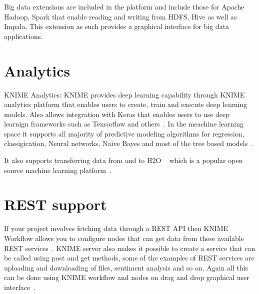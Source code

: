 Big data extensions are included in the platform and include those for Apache
Hadoop, Spark that enable reading and writing from HDFS, Hive as well as
Impala. This extension as such provides a graphical interface for big data
applications.

\section{Analytics}
KNIME Analytics: KNIME provides deep learning capability through KNIME analytics
platform that enables users to create, train and execute deep learning
models. Also allows integration with Keras that enables users to use deep
learnign frameworks such as Tensorflow and others~\cite{hid-sp18-517-dl}. In the
meachine learning space it supports all majority of predictive modeling
algorithms for regression, classigication, Neural networks, Naive Bayes and most
of the tree based models~\cite{hid-sp18-517-pml}.

It also supports transferring data from and to H2O ~\cite{hid-sp18-517-h20}
which is a popular open source machine learning
platform~\cite{hid-sp18-517-knimeh20}.

\section{REST support}

If your project involves fetching data through a REST API then KNIME Workflow
allows you to configure nodes that can get data from these available REST
services~\cite{hid-sp18-517-knimeapi}.  KNIME server also makes it possible to
create a service that can be called using post and get methods, some of the
examples of REST services are uploading and downloading of files, sentiment
analysis and so on. Again all this can be done using KNIME workflow and nodes 
on drag and drop graphical user interface~\cite{hid-sp18-517-knimerest}.

